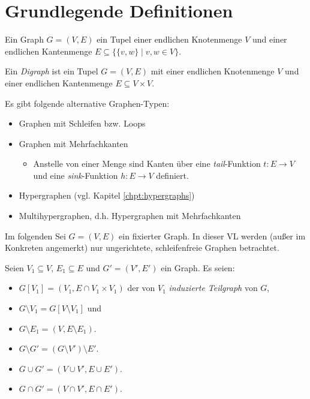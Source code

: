 \chapter{Grundlegende Definitionen}

\begin{definition}[Graph]
    Ein Graph $ G = (V, E) $ ein Tupel einer endlichen Knotenmenge $ V $ und einer endlichen Kantenmenge $ E \subseteq \{ \{ v, w \} \mid v, w \in V \} $.
\end{definition}

\begin{definition}
    Ein \textit{Digraph} ist ein Tupel $ G = (V, E) $ mit einer endlichen Knotenmenge $ V $ und einer endlichen Kantenmenge $ E \subseteq V \times V $.
\end{definition}

\begin{remark}
    Es gibt folgende alternative Graphen-Typen:
    \begin{itemize}
        \item Graphen mit Schleifen bzw. Loops
        \item Graphen mit Mehrfachkanten
        \begin{itemize}
            \item Anstelle von einer Menge sind Kanten über eine \textit{tail}-Funktion $ t : E \to V $ und eine \textit{sink}-Funktion $ h : E \to V $ definiert.
        \end{itemize}
        \item Hypergraphen (vgl. Kapitel \ref{chpt:hypergraphs})
        \item Multihypergraphen, d.h. Hypergraphen mit Mehrfachkanten
    \end{itemize}
\end{remark}

Im folgenden Sei $ G = (V, E) $ ein fixierter Graph.
In dieser VL werden (außer im Konkreten angemerkt) nur ungerichtete, schleifenfreie Graphen betrachtet.

\begin{definition}
    Seien $ V_1 \subseteq V $, $ E_1 \subseteq E $ und $ G' = (V', E') $ ein Graph.
    Es seien:
    \begin{itemize}
        \item $ G[V_1] = (V_1, E \cap V_1 \times V_1) $ der von $ V_1 $ \textit{induzierte Teilgraph} von $ G $,
        \item $ G \setminus V_1 = G[V \setminus V_1] $ und
        \item $ G \setminus E_1 = (V, E \setminus E_1) $.
        \item $ G \setminus G' = (G \setminus V') \setminus E' $.
        \item $ G \cup G' = (V \cup V', E \cup E') $.
        \item $ G \cap G' = (V \cap V', E \cap E') $.
    \end{itemize}
\end{definition}

